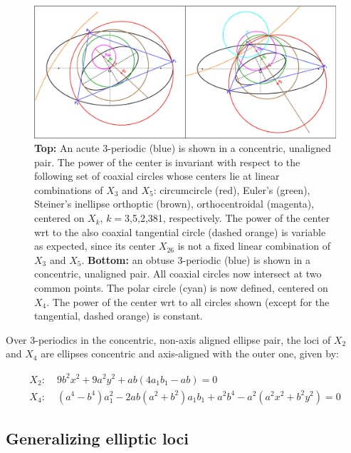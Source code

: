 \begin{figure}
    \centering
    \includegraphics[width=\textwidth]{pics/0155_coaxal_power_both_sides.eps}
    \caption{\textbf{Top:} An acute 3-periodic (blue) is shown in a concentric, unaligned pair. The power of the center is invariant with respect to the following set of coaxial circles whose centers lie at linear combinations of $X_3$ and $X_5$: circumcircle (red), Euler's (green), Steiner's inellipse orthoptic (brown), orthocentroidal (magenta), centered on $X_k$, $k=$3,5,2,381, respectively. The power of the center wrt to the also coaxial tangential circle (dashed orange) is variable as expected, since its center $X_{26}$ is not a fixed linear combination of $X_3$ and $X_5$. \textbf{Bottom:} an obtuse 3-periodic (blue) is shown in a concentric, unaligned pair. All coaxial circles now intersect at two common points. The polar circle (cyan) is now defined, centered on $X_4$. The power of the center wrt to all circles shown (except for the tangential, dashed orange) is constant.}
    \label{fig:coaxal-power}
\end{figure}

\begin{proposition}
Over 3-periodics in the concentric, non-axis aligned ellipse pair, the loci of $X_2$ and $X_4$ are ellipses concentric and axis-aligned with the outer one, given by:

\begin{align*}
X_2:& \; 9b^2x^2 + 9a^2y^2 + ab(4a_1b_1 - ab)=0\\
X_4:&\; (a^4 - b^4)a_1^2 - 2ab(a^2 + b^2)a_1b_1 + a^2b^4 - a^2(a^2x^2 + b^2y^2)=0
\end{align*}
\end{proposition}

\subsection*{Generalizing elliptic loci}

